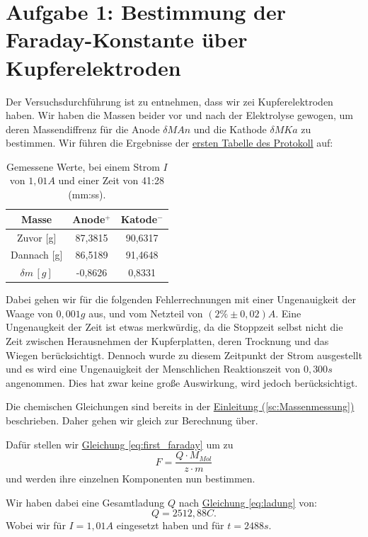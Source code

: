 \twocolumn

\section{Aufgabe 1: Bestimmung der Faraday-Konstante über Kupferelektroden}
Der Versuchsdurchführung ist zu entnehmen, dass wir zei Kupferelektroden haben. Wir haben die Massen beider vor und nach der Elektrolyse gewogen, um deren Massendiffrenz für die Anode $\delta M{An}$ und die Kathode $\delta M{Ka}$ zu bestimmen.
Wir führen die Ergebnisse der \hyperref[Protokoll]{ersten Tabelle des Protokoll} auf:
\begin{table}
    \begin{tabular}{c | c | c}
        \toprule
        Masse & Anode$^+$ & Katode$^-$\\
        \hline
        Zuvor  [g] & 87,3815 & 90,6317 \\
        Dannach [g] & 86,5189 & 91,4648 \\
        \midrule
        $\delta m \, [g]$ & -0,8626 & 0,8331\\
        \bottomrule
    \end{tabular}
    \label{tab:p_1}
    \caption{Gemessene Werte, bei einem Strom $I$ von $1,01A$ und einer Zeit von 41:28 (mm:ss).}
\end{table}

Dabei gehen wir für die folgenden Fehlerrechnungen mit einer Ungenauigkeit der Waage von $0,001g$ aus, und vom Netzteil von $(2\% \pm 0,02)A$.
Eine Ungenaugkeit der Zeit ist etwas merkwürdig, da die Stoppzeit selbst nicht die Zeit zwischen Herausnehmen der Kupferplatten, deren Trocknung und das Wiegen berücksichtigt.
Dennoch wurde zu diesem Zeitpunkt der Strom ausgestellt und es wird eine Ungenauigkeit der Menschlichen Reaktionszeit von $0,300s$ angenommen. Dies hat zwar keine große Auswirkung,
wird jedoch berücksichtigt.

Die chemischen Gleichungen sind bereits in der \hyperref[sc:Massenmessung]{Einleitung (\ref*{sc:Massenmessung})} beschrieben. Daher gehen wir gleich zur Berechnung über.

Dafür stellen wir \hyperref[eq:first_faraday]{Gleichung \ref*{eq:first_faraday}} um zu
\begin{equation}
    F = \frac{Q \cdot M_{Mol}}{z \cdot m}
\end{equation}
und werden ihre einzelnen Komponenten nun bestimmen.

Wir haben dabei eine Gesamtladung $Q$ nach \hyperref[eq:ladung]{Gleichung \ref*{eq:ladung}} von:
\begin{equation}
    Q = 2512,88 C.
\end{equation}
Wobei wir für $I = 1,01A$ eingesetzt haben und für $t = 2488s$.

